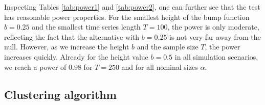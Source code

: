 \documentclass[12pt]{article}
\begin{document}
Inspecting Tables \ref{tab:power1} and \ref{tab:power2}, one can further see that the test has reasonable power properties. For the smallest height of the bump function $b = 0.25$ and the smallest time series length $T = 100$, the power is only moderate, reflecting the fact that the alternative with $b = 0.25$ is not very far away from the null. However, as we increase the height $b$ and the sample size $T$, the power increases quickly. Already for the height value $b = 0.5$ in all simulation scenarios, we reach a power of $0.98$ for $T = 250$ and for all nominal sizes $\alpha$.

\subsection{Clustering algorithm}\label{subsec:sim:clustering}
\end{document}
